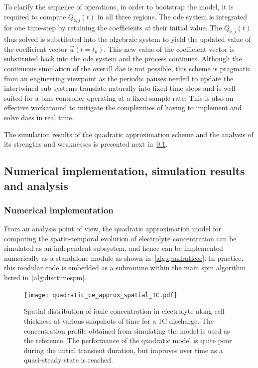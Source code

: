 To clarify the  sequence of operations, in  order to bootstrap the  model, it is
required  to compute  $Q_{\text{e},j}(t)$ in  all three  regions. The  \gls{ode}
system  is  integrated  for  one  time-step by  retaining  the  coefficients  at
their initial  value. The  $Q_{\text{e},j}(t)$ thus  solved is  substituted into
the  algebraic system  to  yield the  updated value  of  the coefficient  vector
$\vec{a}(t=t_k)$. This new  value of the coefficient vector  is substituted back
into the  \gls{ode} system  and the process  continues. Although  the continuous
simulation of  the overall \gls{dae} is  not possible, this scheme  is pragmatic
from  an engineering  viewpoint  as the  periodic pauses  needed  to update  the
intertwined  sub-systems  translate  naturally  into  fixed  time-steps  and  is
well-suited for a \gls{bms} controller operating at a fixed sample rate. This is
also an effective workaround to mitigate the complexities of having to implement
and solve \glspl{dae} in real time.

The   simulation   results   of   the   quadratic   approximation   scheme   and
the   analysis   of   its   strengths   and   weaknesses   is   presented   next
in~\cref{subsec:quadraticsimresultsanalysis}.

\subsection{Numerical implementation, simulation results and analysis}\label{subsec:quadraticsimresultsanalysis}

\subsubsection*{Numerical implementation}
From an analysis point of view,  the quadratic approximation model for computing
the spatio-temporal evolution  of electrolyte concentration can  be simulated as
an  independent  subsystem,  and  hence  can be  implemented  numerically  as  a
standalone module as shown  in~\cref{alg:quadraticce}. In practice, this modular
code is  embedded as  a subroutine  within the  main \gls{spm}  algorithm listed
in~\cref{alg:disctimespm}.



\begin{figure}[!htbp]
    \centering
    \texttt{[image: quadratic\_ce\_approx\_spatial\_1C.pdf]}
    \caption[Spatial distribution of electrolyte concentration for 1C
    discharge]{Spatial distribution of ionic concentration in electrolyte along
        cell thickness at various snapshots of time for a 1C discharge. The
        concentration profile obtained from simulating the 
        model is used as the reference. The performance of the quadratic model
        is quite poor during the initial transient duration, but improves over
    time as a quasi-steady state is reached.}
    \label{fig:spatialionicconc1C}
\end{figure}


